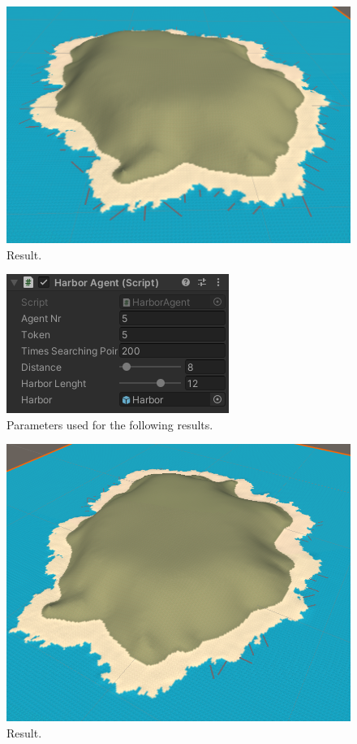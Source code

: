 \documentclass[12pt]{article}
\begin{document}
    \begin{figure}[H]
        \centering
        \includegraphics[scale = 0.3]{images/Harbor agent/1}
        \caption{Result.}
    \end{figure}

    \begin{figure}[H]
        \centering
        \includegraphics[scale = 0.8]{images/Harbor agent/Parameters 2}
        \caption{Parameters used for the following results.}
    \end{figure}

    \begin{figure}[H]
        \centering
        \includegraphics[scale = 0.3]{images/Harbor agent/2}
        \caption{Result.}
    \end{figure}
\end{document}
